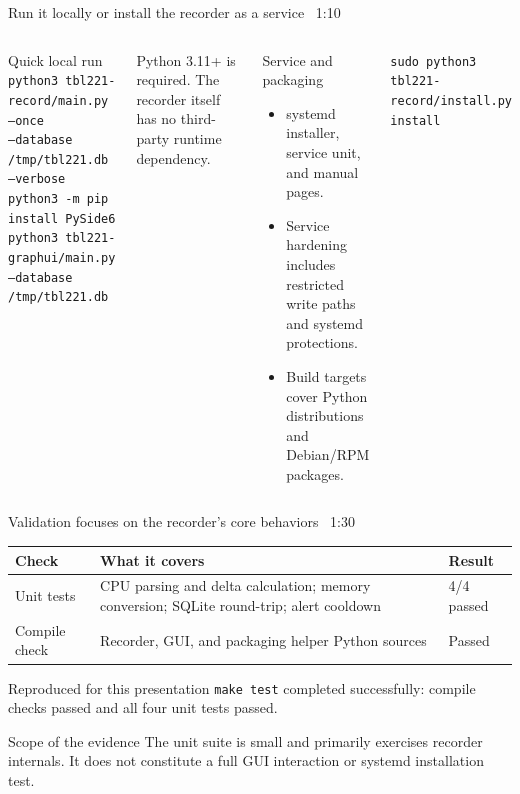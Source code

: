 \documentclass[aspectratio=169,10pt]{beamer}
\newcommand{\slidepace}[1]{\hfill{\scriptsize\color{TBLMuted}#1}}
\begin{document}
\begin{frame}{Run it locally or install the recorder as a service}
\slidepace{~1:10}
\begin{columns}[T,onlytextwidth]
    \begin{block}{Quick local run}
      \scriptsize
      \texttt{python3 tbl221-record/main.py --once}\\
      \texttt{\hspace{1em}--database /tmp/tbl221.db --verbose}\\[0.4em]
      \texttt{python3 -m pip install PySide6}\\
      \texttt{python3 tbl221-graphui/main.py}\\
      \texttt{\hspace{1em}--database /tmp/tbl221.db}
    \end{block}
    Python 3.11+ is required. The recorder itself has no third-party runtime dependency.
    \begin{block}{Service and packaging}
      \begin{itemize}
        \item systemd installer, service unit, and manual pages.
        \item Service hardening includes restricted write paths and systemd protections.
        \item Build targets cover Python distributions and Debian/RPM packages.
      \end{itemize}
    \end{block}
    \scriptsize\texttt{sudo python3 tbl221-record/install.py install}
\end{columns}

\end{frame}

\begin{frame}{Validation focuses on the recorder's core behaviors}
\slidepace{~1:30}
\begin{center}
\small
\begin{tabular}{@{}p{}p{}p{}@{}}
\toprule
\textbf{Check} & \textbf{What it covers} & \textbf{Result} \\
\midrule
Unit tests & CPU parsing and delta calculation; memory conversion; SQLite round-trip; alert cooldown & 4/4 passed \\
Compile check & Recorder, GUI, and packaging helper Python sources & Passed \\
\bottomrule
\end{tabular}
\end{center}
\vspace{0.7em}
\begin{block}{Reproduced for this presentation}
  \texttt{make test} completed successfully: compile checks passed and all four unit tests passed.
\end{block}
\begin{alertblock}{Scope of the evidence}
  The unit suite is small and primarily exercises recorder internals. It does not constitute a full GUI interaction or systemd installation test.
\end{alertblock}
\end{frame}
\end{document}
